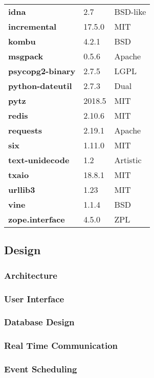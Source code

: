 \begin{longtable}{| p{} | p{} | p{} |}
\textbf{idna} & 2.7 & BSD-like \\
\textbf{incremental} & 17.5.0 & MIT \\
\textbf{kombu} & 4.2.1 & BSD \\
\textbf{msgpack} & 0.5.6 & Apache \\
\textbf{psycopg2-binary} & 2.7.5 & LGPL \\
\textbf{python-dateutil} & 2.7.3 & Dual \\
\textbf{pytz} & 2018.5 & MIT \\
\textbf{redis} & 2.10.6 & MIT \\
\textbf{requests} & 2.19.1 & Apache \\
\textbf{six} & 1.11.0 & MIT \\
\textbf{text-unidecode} & 1.2 & Artistic \\
\textbf{txaio} & 18.8.1 & MIT \\
\textbf{urllib3} & 1.23 & MIT \\
\textbf{vine} & 1.1.4 & BSD \\
\textbf{zope.interface} & 4.5.0 & ZPL \\
\hline
\end{longtable}

\subsection{Design}
\subsubsection{Architecture}
\subsubsection{User Interface}
\subsubsection{Database Design}
\subsubsection{Real Time Communication}
\subsubsection{Event Scheduling}
